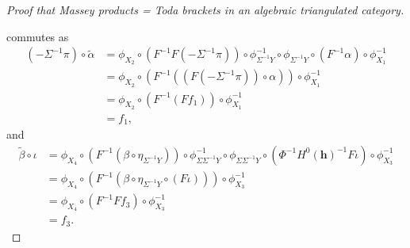 \begin{proof}[Proof that Massey products = Toda brackets in an algebraic triangulated category]
\begin{center}
    \end{center}
    commutes as
    \begin{align*}
        (- \Sigma^{-1} \pi) \circ \tilde{\alpha} &= \phi_{X_2} \circ (F^{-1} F (- \Sigma^{-1} \pi)) \circ \phi^{-1}_{\Sigma^{-1} Y} \circ \phi_{\Sigma^{-1} Y} \circ (F^{-1} \alpha) \circ \phi^{-1}_{X_1}\\
        &= \phi_{X_2} \circ (
            F^{-1} (
                (F (- \Sigma^{-1} \pi)) \circ \alpha
                )
            ) \circ \phi^{-1}_{X_1} \\
        &= \phi_{X_2} \circ (F^{-1} (F f_1)) \circ \phi^{-1}_{X_1} \\
        &= f_1,
    \end{align*}
    and
    \begin{align*}
        \tilde{\beta} \circ \iota &= \phi_{X_4} \circ (F^{-1} (\beta \circ \eta_{\Sigma^{-1} Y})) \circ \phi^{-1}_{\Sigma \Sigma^{-1} Y} \circ \phi_{\Sigma \Sigma^{-1} Y} \circ (\Phi^{-1} H^0(\mathbf{h})^{-1} F \iota) \circ \phi^{-1}_{X_3} \\
        &= \phi_{X_4} \circ (F^{-1}(\beta \circ \eta_{\Sigma^{-1} Y} \circ (F \iota))) \circ \phi^{-1}_{X_3} \\
        &= \phi_{X_4} \circ (F^{-1} F f_3) \circ \phi^{-1}_{X_3} \\
        &= f_3.
    \end{align*}


\end{proof}
